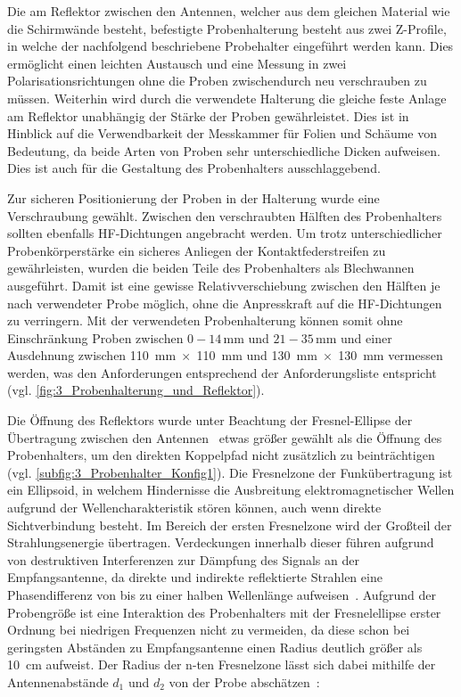 Die am Reflektor zwischen den Antennen, welcher aus dem gleichen Material wie die Schirmwände besteht, befestigte Probenhalterung besteht aus zwei Z-Profile, in welche der nachfolgend beschriebene Probehalter eingeführt werden kann. Dies ermöglicht einen leichten Austausch und eine Messung in zwei Polarisationsrichtungen ohne die Proben zwischendurch neu verschrauben zu müssen. Weiterhin wird durch die verwendete Halterung die gleiche feste Anlage am Reflektor unabhängig der Stärke der Proben gewährleistet. Dies ist in Hinblick auf die Verwendbarkeit der Messkammer für Folien und Schäume von Bedeutung, da beide Arten von Proben sehr unterschiedliche Dicken aufweisen. Dies ist auch für die Gestaltung des Probenhalters ausschlaggebend.
\par
\vspace{\linespace}
Zur sicheren Positionierung der Proben in der Halterung wurde eine Verschraubung gewählt. Zwischen den verschraubten Hälften des Probenhalters sollten ebenfalls HF-Dichtungen angebracht werden. Um trotz unterschiedlicher Probenkörperstärke ein sicheres Anliegen der Kontaktfederstreifen zu gewährleisten, wurden die beiden Teile des Probenhalters als Blechwannen ausgeführt. Damit ist eine gewisse Relativverschiebung zwischen den Hälften je nach verwendeter Probe möglich, ohne die Anpresskraft auf die HF-Dichtungen zu verringern. Mit der verwendeten Probenhalterung können somit ohne Einschränkung Proben zwischen $0-14\,\si{\milli\meter}$ und $21-35\,\si{\milli\meter}$ und einer Ausdehnung zwischen \SI{110}{\milli\meter}$\; \times \;$\SI{110}{\milli\meter} und \SI{130}{\milli\meter}$\; \times \;$\SI{130}{\milli\meter} vermessen werden, was den Anforderungen entsprechend der Anforderungsliste entspricht (vgl. \Abb\ref{fig:3_Probenhalterung_und_Reflektor}). 
\par
\vspace{\linespace}
Die Öffnung des Reflektors wurde unter Beachtung der Fresnel-Ellipse der Übertragung zwischen den Antennen~\cite{Taschenbuch_HF-Technik} etwas größer gewählt als die Öffnung des Probenhalters, um den direkten Koppelpfad nicht zusätzlich zu beinträchtigen (vgl. \Abb\ref{subfig:3_Probenhalter_Konfig1}). Die Fresnelzone der Funkübertragung ist ein Ellipsoid, in welchem Hindernisse die Ausbreitung elektromagnetischer Wellen aufgrund der Wellencharakteristik stören können, auch wenn direkte Sichtverbindung besteht. Im Bereich der ersten Fresnelzone wird der Großteil der Strahlungsenergie übertragen. Verdeckungen innerhalb dieser führen aufgrund von destruktiven Interferenzen zur Dämpfung des Signals an der Empfangsantenne, da direkte und indirekte reflektierte Strahlen eine Phasendifferenz von bis zu einer halben Wellenlänge aufweisen~\cite{Advanced_Elecronic_Communication_Systems}. Aufgrund der Probengröße ist eine Interaktion des Probenhalters mit der Fresnelellipse erster Ordnung bei niedrigen Frequenzen nicht zu vermeiden, da diese schon bei geringsten Abständen zu Empfangsantenne einen Radius deutlich größer als \SI{10}{\centi\meter} aufweist. Der Radius der n-ten Fresnelzone lässt sich dabei mithilfe der Antennenabstände $d_1$ und $d_2$ von der Probe abschätzen~\cite{Taschenbuch_HF-Technik}:

